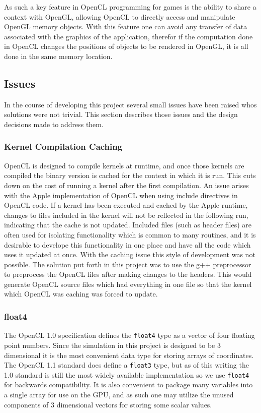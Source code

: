 As such a key feature in OpenCL programming for games is the ability to share a
context with OpenGL, allowing OpenCL to directly access and manipulate OpenGL
memory objects. With this feature one can avoid any transfer of data associated
with the graphics of the application, therefor if the computation done in
OpenCL changes the positions of objects to be rendered in OpenGL, it is all
done in the same memory location.


\subsection{Issues}
In the course of developing this project several small issues have been raised
whos solutions were not trivial. This section describes those issues and the
design decisions made to address them.

\subsubsection{Kernel Compilation Caching}
OpenCL is designed to compile kernels at runtime, and once those kernels are
compiled the binary version is cached for the context in which it is run. This
cuts down on the cost of running a kernel after the first compilation. An issue
arises with the Apple implementation of OpenCL when using include directives in
OpenCL code. If a kernel has been executed and cached by the Apple runtime,
changes to files included in the kernel will not be reflected in the following
run, indicating that the cache is not updated. Included files (such as header
files) are often used for isolating functionality which is common to many
routines, and it is desirable to develope this functionality in one place and
have all the code which uses it updated at once. With the caching issue this
style of development was not possible. The solution put forth in this project
was to use the g++ preprocessor to preprocess the OpenCL files after making
changes to the headers. This would generate OpenCL source files which had
everything in one file so that the kernel which OpenCL was caching was forced
to update. 


\subsubsection{float4}
The OpenCL 1.0 specification defines the \verb|float4| type as a vector of four
floating point numbers. Since the simulation in this project is designed to be
3 dimensional it is the most convenient data type for storing arrays of
coordinates. The OpenCL 1.1 standard does define a \verb|float3| type, but as
of this writing the 1.0 standard is still the most widely available
implementation so we use \verb|float4| for backwards compatibility. It is also
convenient to package many variables into a single array for use on the GPU,
and as such one may utilize the unused components of 3 dimensional vectors for
storing some scalar values.

